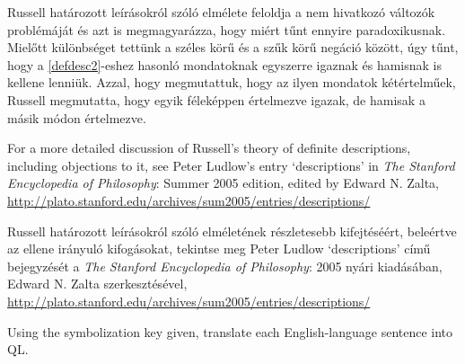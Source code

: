 Russell határozott leírásokról szóló elmélete feloldja a nem hivatkozó változók problémáját és azt is megmagyarázza, hogy miért tűnt ennyire paradoxikusnak. Mielőtt különbséget tettünk a széles körű és a szűk körű negáció között, úgy tűnt, hogy a \ref{defdesc2}-eshez hasonló mondatoknak egyszerre igaznak és hamisnak is kellene lenniük. Azzal, hogy megmutattuk, hogy az ilyen mondatok kétértelműek, Russell megmutatta, hogy egyik féleképpen értelmezve igazak, de hamisak a másik módon értelmezve.

For a more detailed discussion of Russell's theory of definite descriptions, including objections to it, see Peter Ludlow's entry `descriptions' in \emph{The Stanford Encyclopedia of Philosophy}: Summer 2005 edition, edited by Edward N. Zalta, \url{http://plato.stanford.edu/archives/sum2005/entries/descriptions/}

Russell határozott leírásokról szóló elméletének részletesebb kifejtéséért, beleértve az ellene irányuló kifogásokat, tekintse meg Peter Ludlow `descriptions' című bejegyzését a \emph{The Stanford Encyclopedia of Philosophy}: 2005 nyári kiadásában, Edward N. Zalta szerkesztésével, \url{http://plato.stanford.edu/archives/sum2005/entries/descriptions/}





\practiceproblems

\solutions
\problempart
\label{pr.QLalligators}
Using the symbolization key given, translate each English-language sentence into QL.

